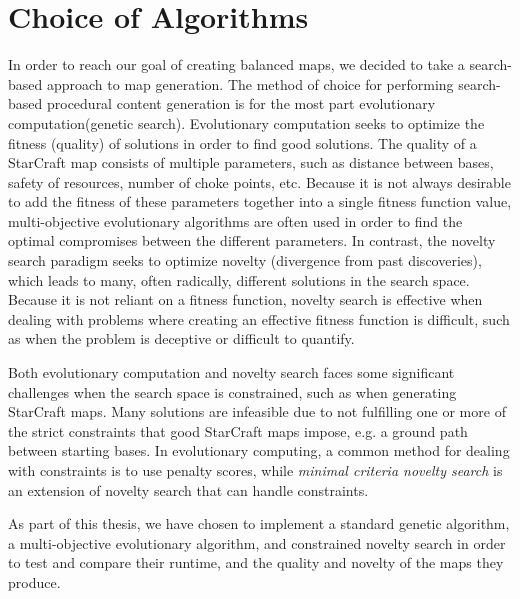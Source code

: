 \section{Choice of Algorithms}
\label{methodology_algorithmchoice}
In order to reach our goal of creating balanced maps, we decided to take a search-based approach to map generation. The method of choice for performing search-based procedural content generation is for the most part evolutionary computation\cite{togelius2011search}(genetic search). Evolutionary computation seeks to optimize the fitness (quality) of solutions in order to find good solutions. The quality of a StarCraft map consists of multiple parameters, such as distance between bases, safety of resources, number of choke points, etc. Because it is not always desirable to add the fitness of these parameters together into a single fitness function value, multi-objective evolutionary algorithms are often used in order to find the optimal compromises between the different parameters. In contrast, the novelty search paradigm seeks to optimize novelty (divergence from past discoveries), which leads to many, often radically, different solutions in the search space. Because it is not reliant on a fitness function, novelty search is effective when dealing with problems where creating an effective fitness function is difficult, such as when the problem is deceptive or difficult to quantify.

Both evolutionary computation and novelty search faces some significant challenges when the search space is constrained\cite{liapis2014constrained}, such as when generating StarCraft maps. Many solutions are infeasible due to not fulfilling one or more of the strict constraints that good StarCraft maps impose, e.g. a ground path between starting bases. In evolutionary computing, a common method for dealing with constraints is to use penalty scores, while \textit{minimal criteria novelty search} is an extension of novelty search that can handle constraints.

As part of this thesis, we have chosen to implement a standard genetic algorithm, a multi-objective evolutionary algorithm, and constrained novelty search in order to test and compare their runtime, and the quality and novelty of the maps they produce.